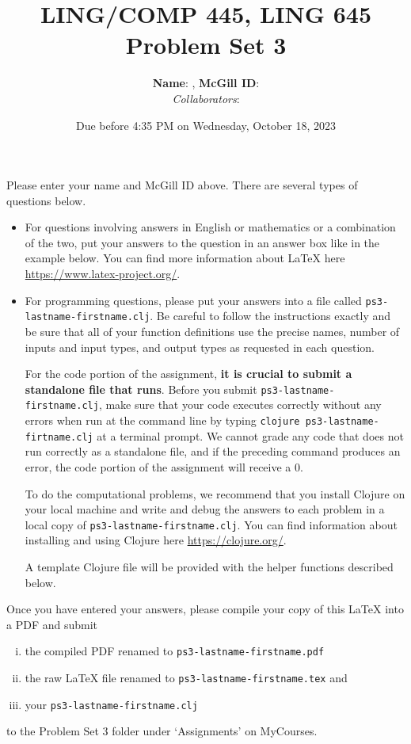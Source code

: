 \documentclass[10pt]{article}
\author{
  \textbf{Name}:       %
, \textbf{McGill ID}:  %
\\ \textit{Collaborators}:  %
}
\newcommand{\PSnum}{3}
\begin{document}
\title{LING/COMP 445, LING 645\\Problem Set \PSnum}
\date{Due before 4:35 PM on Wednesday, October 18, 2023}
\maketitle
Please enter your name and McGill ID above.
There are several types of questions below.
\begin{itemize}
\item
For questions involving answers in English or mathematics or a
combination of the two, put your answers to the question in an
answer box like in the example below. You can find more
information about \LaTeX{} here \url{https://www.latex-project.org/}.

\item For programming questions,
please put your answers into a file called
\texttt{ps\PSnum-lastname-firstname.clj}. Be careful to follow the instructions
exactly and be sure that all of your function definitions use the
precise names, number of inputs and input types, and output types as
requested in each question.

For the code portion of the assignment, \textbf{it is crucial to submit a
standalone file that runs}. Before you submit \texttt{ps\PSnum-lastname-firstname.clj},
make sure that your code executes correctly without any errors
when run at the command line by typing
\texttt{clojure ps\PSnum-lastname-firtname.clj} at a terminal
prompt. We cannot grade any code that does not run correctly as a
standalone file, and if the preceding command produces an error,
the code portion of the assignment will receive a $0$.

To do the computational problems, we recommend that you install
Clojure on your local machine and write and debug the answers to each
problem in a local copy of \texttt{ps\PSnum-lastname-firstname.clj}. You can
find information about installing and using Clojure here
\url{https://clojure.org/}.

A template Clojure file will be provided with the helper
functions described below.
\end{itemize}
Once you have entered your answers, please compile your copy of this
\LaTeX{} into a PDF and submit
\begin{enumerate}[(i),noitemsep]
\item
the compiled PDF renamed to
\texttt{ps\PSnum-lastname-firstname.pdf}
\item
the raw \LaTeX{} file renamed to
\texttt{ps\PSnum-lastname-firstname.tex} and
\item
your \texttt{ps\PSnum-lastname-firstname.clj}
\end{enumerate}
to the Problem Set \PSnum{} folder under `Assignments' on MyCourses.
\end{document}
